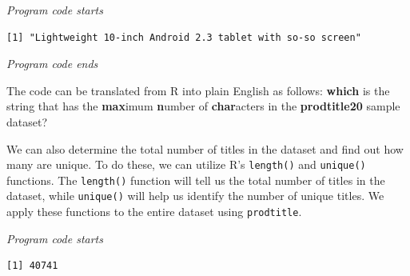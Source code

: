 \emph{Program code starts}

\begin{Shaded}
\begin{Highlighting}[]
\NormalTok{prodtitle20[}\NormalTok{(}\SpecialCharTok{==}\NormalTok{(}\NormalTok{(prodtitle20)))]}
\end{Highlighting}
\end{Shaded}

\begin{verbatim}
[1] "Lightweight 10-inch Android 2.3 tablet with so-so screen"
\end{verbatim}

\emph{Program code ends}

The code can be translated from R into plain English as follows: \textbf{which} is
the string that has the \textbf{max}imum \textbf{n}umber of
\textbf{char}acters in the \textbf{prodtitle20} sample dataset?

We can also determine the total number of titles in the dataset and find out how
many are unique. To do these, we can utilize R's
\texttt{length()} and \texttt{unique()} functions. The \texttt{length()}
function will tell us the total number of titles in the dataset, while
\texttt{unique()} will help us identify the number of unique titles. We
apply these functions to the entire dataset using \texttt{prodtitle}.

\emph{Program code starts}

\begin{Shaded}
\begin{Highlighting}[]
\end{Highlighting}
\end{Shaded}

\begin{verbatim}
[1] 40741
\end{verbatim}

\begin{Shaded}
\begin{Highlighting}[]
\NormalTok{(}
\end{Highlighting}
\end{Shaded}

